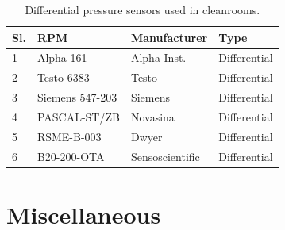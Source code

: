 \begin{table}[h!]
	\footnotesize
	\centering
		
		\begin{tabular}{p{0.12cm}|p{2.3cm}|p{1.5cm}|p{1.40cm}}
			\hline
			 \cellcolor [gray]{0.85} \textbf{Sl.} & \cellcolor [gray]{0.85} \textbf{RPM} &  \cellcolor [gray]{0.85} \textbf{Manufacturer} & \cellcolor [gray]{0.85} \textbf{Type}   \\
			\hline
			\hline
			1 & Alpha 161 \cite{Alpha161} & Alpha Inst. & Differential  \\
			\hline
    		2 & Testo 6383 \cite{testo-6383}  & Testo  & Differential\\
			\hline
                3 & Siemens 547-203 \cite{siemens547} & Siemens & Differential \\
			\hline
		    4 & PASCAL-ST/ZB \cite{PASCAL-ST} & Novasina & Differential  \\
			\hline
			5 & RSME-B-003 \cite{RSMEB003}& Dwyer    & Differential  \\
			\hline
			6 & B20-200-OTA \cite{sensos}& Sensoscientific   & Differential \\
			\hline			
		\end{tabular}
  \caption{\label{table:DPS in cleanroom}Differential pressure sensors used in cleanrooms.}
		
\end{table}
\vspace{-0.40em}







\section{Miscellaneous}

